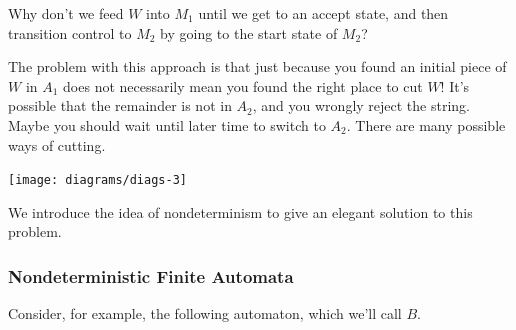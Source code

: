 Why don't we feed $W$ into $M_1$ until we get to an accept state, and then %
transition control to $M_2$ by going to the start state of $M_2$? %

The problem with this approach is that just because you found an initial piece of $W$ in $A_1$ does not necessarily mean you found the right place to cut $W$! It's possible that the remainder is not in $A_2$, and you wrongly reject the string. Maybe you should wait until later time %
to switch to $A_2$. There are many possible ways of cutting. 

\begin{center}
\texttt{[image: diagrams/diags-3]}
\end{center}

We introduce the idea of nondeterminism to give an elegant solution to this problem.
%
\subsubsection{Nondeterministic Finite Automata}
Consider, for example, the following automaton, which we'll call $B$.

